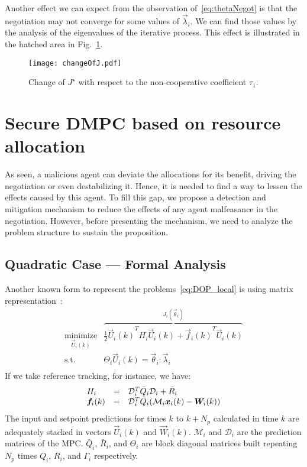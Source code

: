 \documentclass[a4paper, 10 pt, conference]{ieeeconf}  %
\begin{document}
Another effect we can expect from the observation of~\eqref{eq:thetaNegot} is that the negotiation may not converge for some values of $\vec{\lambda}_{i}$. We can find those values by the analysis of the eigenvalues of the iterative process. This effect is illustrated in the hatched area in Fig.~\ref{fig:Jagainsttau}.

\begin{figure}[!t]
  \centering
  \texttt{[image: changeOfJ.pdf]}
  \caption{Change of $J^{\star}$ with respect to the non-cooperative coefficient $\tau_1$.}\label{fig:Jagainsttau}
\end{figure}

\section{Secure DMPC based on resource allocation}\label{sec:mitigation}

As seen, a malicious agent can deviate the allocations for its benefit, driving the negotiation or even destabilizing it.
Hence, it is needed to find a way to lessen the effects caused by this agent.
To fill this gap, we propose a detection and mitigation mechanism to reduce the effects of any agent malfeasance in the negotiation.
However, before presenting the mechanism, we need to analyze the problem structure to sustain the proposition.
\subsection{Quadratic Case --- Formal Analysis}\label{ssec:FA}
Another known form to represent the problems~\eqref{eq:DOP_local} is using matrix representation~\cite{ChanfreutEtAl2018}:
\begin{equation}
\begin{matrix}
\underset{\vec{U}_i(k)}{\mathrm{minimize}}& \overbrace{\frac{1}{2}{\vec{U}_i(k)}^T H_i\vec{U}_i(k)+{\vec{f}_i(k)}^T\vec{U}_i(k)}^{\textstyle J_{i}(\vec{\theta}_{i})}\\
\mathrm{s.t.}&\Theta_{i}\vec{U}_i(k)=\vec{\theta}_{i}:\vec{\lambda}_{i}\\
\end{matrix}
\label{eq:dmpcModLOP}
\end{equation}
If we take reference tracking, for instance, we have:
\begin{equation}
\small\begin{matrix*}[l]
 H_i&=&\mathcal{D}_i^T\bar{Q}_i\mathcal{D}_i+\bar{R}_i\\
\vec{f}_i(k)&=&\mathcal{D}_i^T\bar{Q}_i(\mathcal{M}_i\vec{x}_i(k)-\vec{W}_i(k))\\

\end{matrix*}
\label{eq:matrices}
\end{equation}
The input and setpoint predictions for times ${k}$ to ${k+N_{p}}$ calculated in time $k$ are adequately stacked in vectors $\vec{U}_{i}(k)$ and $\vec{W}_{i}(k)$.
${\mathcal{M}_{i}}$  and ${\mathcal{D}_{i}}$ are the prediction matrices of the MPC\@.
$\bar{Q}_{i}$, $\bar{R}_{i}$, and $\Theta_{i}$ are block diagonal matrices built repeating $N_{p}$ times $Q_{i}$, $R_{i}$, and $\Gamma_i$ respectively.
\end{document}
